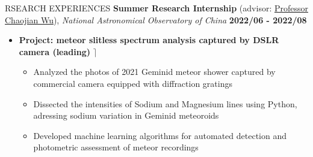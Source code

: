 \documentclass[10pt]{article} %
\begin{document}
\begin{section}{RSEARCH EXPERIENCES}
\textbf{Summer Research Internship} (advisor: \href{mailto:chjwu@bao.ac.cn}{Professor Chaojian Wu}), \textit{National Astronomical Observatory of China} \hfill \textbf{2022/06 - 2022/08} 
\begin{itemize}[leftmargin=1.5em]
    \item \textbf{Project: meteor slitless spectrum analysis captured by DSLR camera (leading)} \hfill $\rceil$
    \begin{itemize}[leftmargin=1.5em]
        \item Analyzed the photos of 2021 Geminid meteor shower captured by commercial camera equipped with diffraction gratings
        \item Dissected the intensities of Sodium and Magnesium lines using Python, adressing sodium variation in Geminid meteoroids
        \item Developed machine learning algorithms for automated detection and photometric assessment of meteor recordings
    \end{itemize}
\end{itemize}


\end{section}
\end{document}
